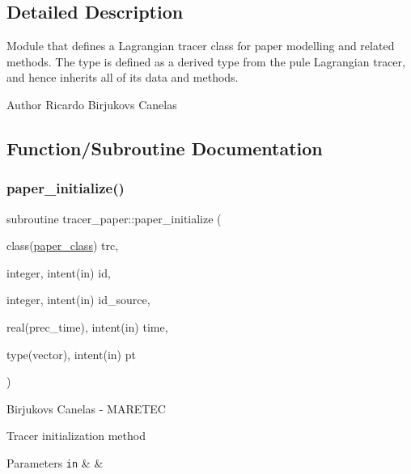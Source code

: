 \subsection{Detailed Description}
Module that defines a Lagrangian tracer class for paper modelling and related methods. The type is defined as a derived type from the pule Lagrangian tracer, and hence inherits all of it\textquotesingle{}s data and methods. 

\begin{DoxyAuthor}{Author}
Ricardo Birjukovs Canelas 
\end{DoxyAuthor}


\subsection{Function/\+Subroutine Documentation}
\mbox{\label{namespacetracer__paper_aad494497e50de353bb7458cc82fd617d}} 
\subsubsection{\texorpdfstring{paper\+\_\+initialize()}{paper\_initialize()}}
{\footnotesize\ttfamily subroutine tracer\+\_\+paper\+::paper\+\_\+initialize (\begin{DoxyParamCaption}\item[{class(\mbox{\hyperlink{structtracer__paper_1_1paper__class}{paper\+\_\+class}})}]{trc,  }\item[{integer, intent(in)}]{id,  }\item[{integer, intent(in)}]{id\+\_\+source,  }\item[{real(prec\+\_\+time), intent(in)}]{time,  }\item[{type(vector), intent(in)}]{pt }\end{DoxyParamCaption})\hspace{0.3cm}{\ttfamily [private]}}



Birjukovs Canelas -\/ M\+A\+R\+E\+T\+EC 

Tracer initialization method 
\begin{DoxyParams}[1]{Parameters}
\mbox{\tt in}  & {\em } & \\
\hline
\end{DoxyParams}

